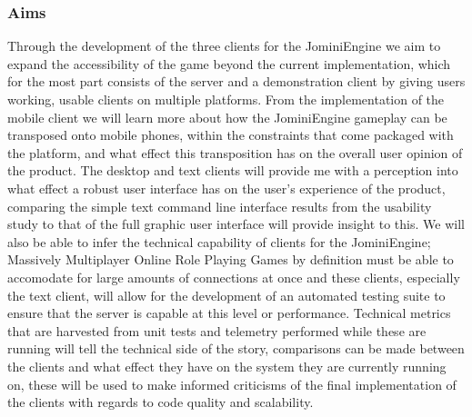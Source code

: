 \documentclass{article}
\begin{document}
	\subsubsection{Aims}
	Through the development of the three clients for the JominiEngine we aim to expand the accessibility of the game beyond the current implementation, which for the most part consists of the server and a demonstration client by giving users working, usable clients on multiple platforms. From the implementation of the mobile client we will learn more about how the JominiEngine gameplay can be transposed onto mobile phones, within the constraints that come packaged with the platform, and what effect this transposition has on the overall user opinion of the product. The desktop and text clients will provide me with a perception into what effect a robust user interface has on the user's experience of the product, comparing the simple text command line interface results from the usability study to that of the full graphic user interface will provide insight to this. We will also be able to infer the technical capability of clients for the JominiEngine; Massively Multiplayer Online Role Playing Games by definition must be able to accomodate for large amounts of connections at once and these clients, especially the text client, will allow for the development of an automated testing suite to ensure that the server is capable at this level or performance. Technical metrics that are harvested from unit tests and telemetry performed while these are running will tell the technical side of the story, comparisons can be made between the clients and what effect they have on the system they are currently running on, these will be used to make informed criticisms of the final implementation of the clients with regards to code quality and scalability.
\end{document}
